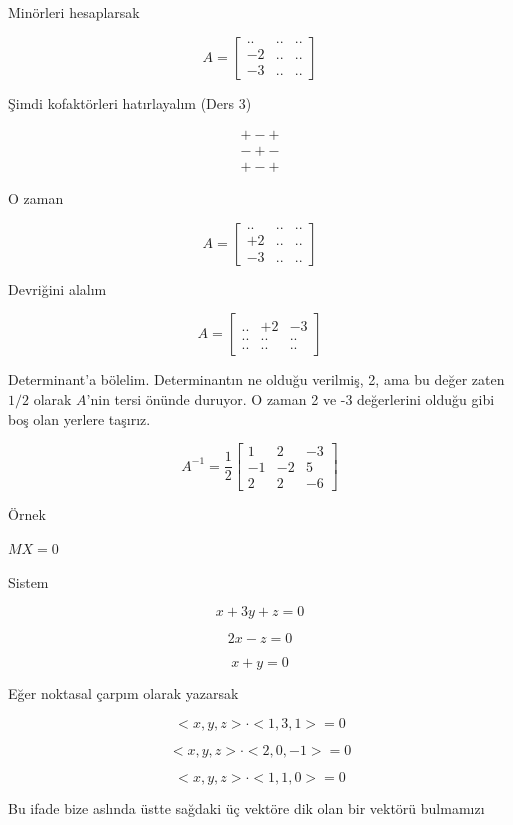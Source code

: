 \documentclass[12pt,fleqn]{article}\usepackage{../../common}
\begin{document}
Minörleri hesaplarsak

$$ A = 
\left[\begin{array}{rrr}
.. & .. & ..\\
-2 & .. & ..\\
-3 & .. & ..
\end{array}\right]
 $$

Şimdi kofaktörleri hatırlayalım (Ders 3)

$$ 
\begin{array}{rr}
+ - + \\
- + - \\
+ - + 
\end{array}
 $$

O zaman

$$ A = 
\left[\begin{array}{rrr}
.. & .. & ..\\
+2 & .. & ..\\
-3 & .. & ..
\end{array}\right]
 $$

Devriğini alalım

$$ A = 
\left[\begin{array}{rrr}
.. & +2 & -3\\
.. & .. & ..\\
.. & .. & ..
\end{array}\right]
 $$

Determinant'a bölelim. Determinantın ne olduğu verilmiş, 2, ama bu değer zaten
$1/2$ olarak $A$'nin tersi önünde duruyor. O zaman 2 ve -3 değerlerini olduğu
gibi boş olan yerlere taşırız.

$$ A^{-1} = \frac{1}{2}
\left[\begin{array}{rrr}
1 & 2 & -3 \\
-1 & -2 & 5 \\
2 & 2 & -6
\end{array}\right]
 $$

Örnek

$MX = 0$

Sistem

$$ x + 3y + z = 0 $$

$$ 2x - z  = 0$$

$$ x + y = 0 $$

Eğer noktasal çarpım olarak yazarsak 

$$ < x,y,z > \cdot < 1,3,1 > = 0 $$

$$ < x,y,z > \cdot < 2,0,-1 > = 0 $$

$$ < x,y,z > \cdot < 1,1,0 > = 0 $$

Bu ifade bize aslında üstte sağdaki üç vektöre dik olan bir vektörü bulmamızı
\end{document}
